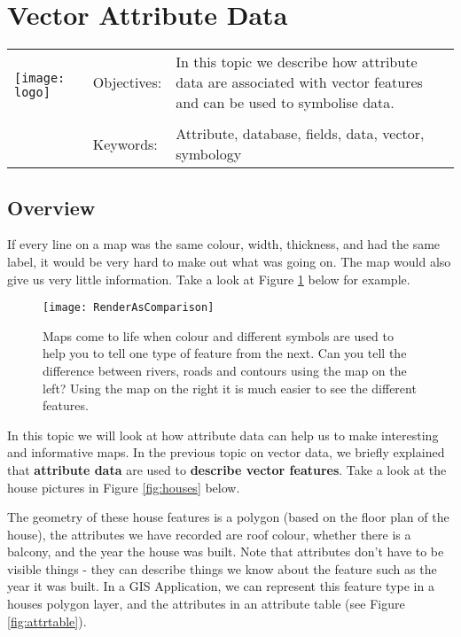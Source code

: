 

\section{Vector Attribute Data}\label{sec:attributes}
\begin{tabular}{p{3.5cm}p{6cm}p{6cm}}
\multirow{2}{*}{\texttt{[image: logo]}} & Objectives: &
In this topic we describe how attribute data are associated with vector
features and can be used to symbolise data. \\
& & \\
& Keywords: & 
Attribute, database, fields, data, vector, symbology \\
\hline
\end{tabular}

\subsection{Overview}\label{subsec:overview}

If every line on a map was the same colour, width, thickness, and had the
same label, it would be very hard to make out what was going on. The map
would also give us very little information. Take a look at Figure
\ref{fig:rendercompare} below for example. 

\begin{figure}[ht]
   \begin{center}
   \caption{Maps come to life when colour and different symbols are used to
help you to tell one type of feature from the next. Can you tell the
difference between rivers, roads and contours using the map on the left?
Using the map on the right it is much easier to see the different features.}
\label{fig:rendercompare}\smallskip
   \texttt{[image: RenderAsComparison]}
\end{center}
\end{figure}

In this topic we will look at how attribute data can help us to make
interesting and informative maps. In the previous topic on vector data, we
briefly explained that \textbf{attribute data} are used to \textbf{describe
vector features}. Take a look at the house pictures in Figure
\ref{fig:houses} below.

The geometry of these house features is a polygon (based on the floor plan of
the house), the attributes we have recorded are roof colour, whether there is
a balcony, and the year the house was built. Note that attributes don't have
to be visible things - they can describe things we know about the feature
such as the year it was built. In a GIS Application, we can represent this
feature type in a houses polygon layer, and the attributes in an attribute
table (see Figure \ref{fig:attrtable}).

